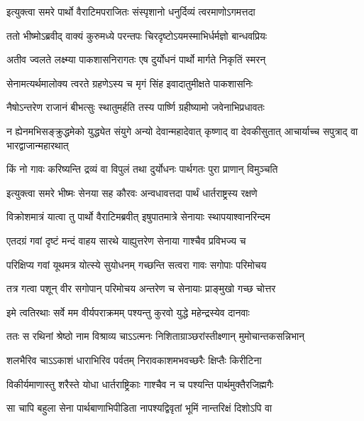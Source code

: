
\twolineshloka
{इत्युक्त्वा समरे पार्थो वैराटिमपराजितः}
{संस्पृशानो धनुर्दिव्यं त्वरमाणोऽगमत्तदा}


\twolineshloka
{ततो भीष्मोऽब्रवीद् वाक्यं कुरुमध्ये परन्तपः}
{चिरदृष्टोऽयमस्माभिर्धर्मज्ञो बान्धवप्रियः}



\twolineshloka
{अतीव ज्वलते लक्ष्म्या पाकशासनिरागतः}
{एष दुर्योधनं पार्थो मार्गते निकृतिं स्मरन्}


\twolineshloka
{सेनामत्यर्थमालोक्य त्वरते ग्रहणेऽस्य च}
{मृगं सिंह इवादातुमीक्षते पाकशासनिः}


\twolineshloka
{नैषोऽन्तरेण राजानं बीभत्सुः स्थातुमर्हति}
{तस्य पार्ष्णि ग्रहीष्यामो जवेनाभिप्रधावतः}


\threelineshloka
{न ह्येनमभिसङ्क्रुद्धमेको युद्ध्येत संयुगे}
{अन्यो देवान्महादेवात् कृष्णाद् वा देवकीसुतात्}
{आचार्याच्च सपुत्राद् वा भारद्वाजान्महारथात्}


\twolineshloka
{किं नो गावः करिष्यन्ति द्रव्यं वा विपुलं तथा}
{दुर्योधनः पार्थगतः पुरा प्राणान् विमुञ्चति}



\twolineshloka
{इत्युक्त्वा समरे भीष्मः सेनया सह कौरवः}
{अन्वधावत्तदा पार्थं धार्तराष्ट्रस्य रक्षणे}


\twolineshloka
{विक्रोशमात्रं यात्वा तु पार्थो वैराटिमब्रवीत्}
{इषुपातमात्रे सेनायाः स्थापयाश्वानरिन्दम}


\twolineshloka
{एतदग्रं गवां दृष्टं मन्दं वाहय सारथे}
{याह्युत्तरेण सेनाया गाश्चैव प्रविभज्य च}


\twolineshloka
{परिक्षिप्य गवां यूथमत्र योत्स्ये सुयोधनम्}
{गच्छन्ति सत्वरा गावः सगोपाः परिमोचय}


\twolineshloka
{तत्र गत्वा पशून् वीर सगोपान् परिमोचय}
{अन्तरेण च सेनायाः प्राङ्मुखो गच्छ चोत्तर}


\twolineshloka
{इमे त्वतिरथाः सर्वे मम वीर्यपराक्रमम्}
{पश्यन्तु कुरवो युद्धे महेन्द्रस्येव दानवाः}



\twolineshloka
{ततः स रथिनां श्रेष्ठो नाम विश्राव्य चाऽऽत्मनः}
{निशिताग्राञ्छरांस्तीक्ष्णान् मुमोचान्तकसन्निभान्}


\twolineshloka
{शलभैरिव चाऽऽकाशं धाराभिरिव पर्वतम्}
{निरावकाशमभवच्छरैः क्षिप्तैः किरीटिना}


\twolineshloka
{विकीर्यमाणास्तु शरैस्ते योधा धार्तराष्ट्रिकाः}
{गाश्चैव न च पश्यन्ति पार्थमुक्तैरजिह्मगैः}


\twolineshloka
{सा चापि बहुला सेना पार्थबाणाभिपीडिता}
{नापश्यद्विवृतां भूमिं नान्तरिक्षं दिशोऽपि वा}


